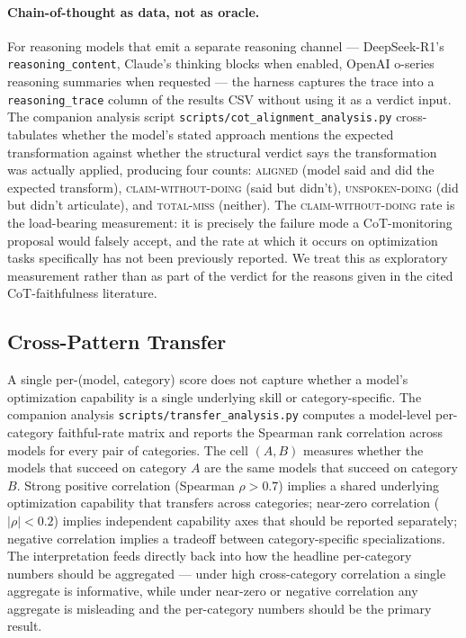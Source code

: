 \paragraph{Chain-of-thought as data, not as oracle.} For reasoning models that emit a separate reasoning channel --- DeepSeek-R1's \texttt{reasoning\_content}, Claude's thinking blocks when enabled, OpenAI o-series reasoning summaries when requested --- the harness captures the trace into a \texttt{reasoning\_trace} column of the results CSV without using it as a verdict input. The companion analysis script \texttt{scripts/cot\_alignment\_analysis.py} cross-tabulates whether the model's stated approach mentions the expected transformation against whether the structural verdict says the transformation was actually applied, producing four counts: \textsc{aligned} (model said and did the expected transform), \textsc{claim-without-doing} (said but didn't), \textsc{unspoken-doing} (did but didn't articulate), and \textsc{total-miss} (neither). The \textsc{claim-without-doing} rate is the load-bearing measurement: it is precisely the failure mode a CoT-monitoring proposal would falsely accept, and the rate at which it occurs on optimization tasks specifically has not been previously reported. We treat this as exploratory measurement rather than as part of the verdict for the reasons given in the cited CoT-faithfulness literature.

\subsection{Cross-Pattern Transfer}\label{subsec:transfer}

A single per-(model, category) score does not capture whether a model's optimization capability is a single underlying skill or category-specific. The companion analysis \texttt{scripts/transfer\_analysis.py} computes a model-level per-category faithful-rate matrix and reports the Spearman rank correlation across models for every pair of categories. The cell $(A, B)$ measures whether the models that succeed on category $A$ are the same models that succeed on category $B$. Strong positive correlation (Spearman $\rho > 0.7$) implies a shared underlying optimization capability that transfers across categories; near-zero correlation ($|\rho| < 0.2$) implies independent capability axes that should be reported separately; negative correlation implies a tradeoff between category-specific specializations. The interpretation feeds directly back into how the headline per-category numbers should be aggregated --- under high cross-category correlation a single aggregate is informative, while under near-zero or negative correlation any aggregate is misleading and the per-category numbers should be the primary result.

